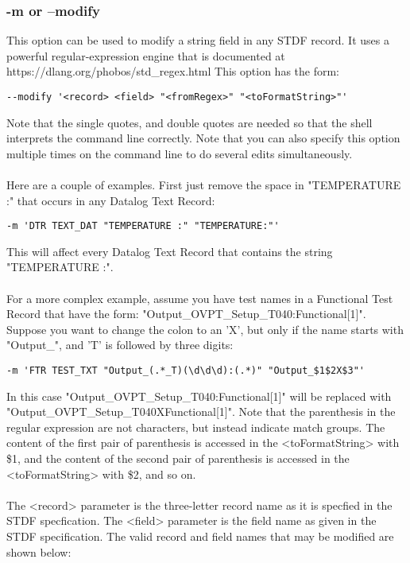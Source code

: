 \documentclass[letterpaper]{article}
\begin{document}
\subsubsection{\bf -m or --modify}
This option can be used to modify a string field in any STDF record. It uses a powerful
regular-expression engine that is documented at https://dlang.org/phobos/std\_regex.html
This option has the form:
\begin{verbatim}
--modify '<record> <field> "<fromRegex>" "<toFormatString>"'
\end{verbatim}
Note that the single quotes, and double quotes are needed so that the shell
interprets the command line correctly.  Note that you can also specify this
option multiple times on the command line to do several edits simultaneously.
\\
\\
Here are a couple of examples.  First just remove the space in "TEMPERATURE :"
that occurs in any Datalog Text Record:
\begin{verbatim}
-m 'DTR TEXT_DAT "TEMPERATURE :" "TEMPERATURE:"'
\end{verbatim}
This will affect every Datalog Text Record that contains the string "TEMPERATURE :".\\
\\
For a more complex example, assume you have test names in a Functional Test Record
that have the form: "Output\_OVPT\_Setup\_T040:Functional[1]". Suppose you want to change
the colon to an 'X', but only if the name starts with "Output\_", and 'T' is followed by three digits:
\begin{verbatim}
-m 'FTR TEST_TXT "Output_(.*_T)(\d\d\d):(.*)" "Output_$1$2X$3"'
\end{verbatim}
In this case "Output\_OVPT\_Setup\_T040:Functional[1]" will be replaced with "Output\_OVPT\_Setup\_T040XFunctional[1]".
Note that the parenthesis in the regular expression are not characters, but instead indicate match groups.
The content of the first pair of parenthesis is accessed in the <toFormatString> with \$1, and the content
of the second pair of parenthesis is accessed in the <toFormatString> with \$2, and so on.
\\
\\
\noindent
The <record> parameter is the three-letter record name as it is specfied
in the STDF specfication.  The <field> parameter is the field name as
given in the STDF specification.  The valid record and field names
that may be modified are shown below:
\end{document}

